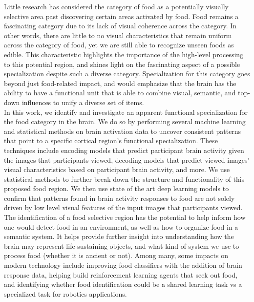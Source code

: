 \documentclass[../thesis.tex]{subfiles}
\begin{document}
Little research has considered the category of food as a potentially visually selective area past discovering certain areas activated by food. Food remains a fascinating category due to its lack of visual coherence across the category. In other words, there are little to no visual characteristics that remain uniform across the category of food, yet we are still able to recognize unseen foods as edible. This characteristic highlights the importance of the high-level processing to this potential region, and shines light on the fascinating aspect of a possible specialization despite such a diverse category. Specialization for this category goes beyond just food-related impact, and would emphasize that the brain has the ability to have a functional unit that is able to combine visual, semantic, and top-down influences to unify a diverse set of items. \\

In this work, we identify and investigate an apparent functional specialization for the food category in the brain. We do so by performing several machine learning and statistical methods on brain activation data to uncover consistent patterns that point to a specific cortical region's functional specialization. These techniques include encoding models that predict participant brain activity given the images that participants viewed, decoding models that predict viewed images' visual characteristics based on participant brain activity, and more. We use statistical methods to further break down the structure and functionality of this proposed food region. We then use state of the art deep learning models to confirm that patterns found in brain activity responses to food are not solely driven by low level visual features of the input images that participants viewed. \\

The identification of a food selective region has the potential to help inform how one would detect food in an environment, as well as how to organize food in a semantic system. It helps provide further insight into understanding how the brain may represent life-sustaining objects, and what kind of system we use to process food (whether it is ancient or not). Among many, some impacts on modern technology include improving food classifiers with the addition of brain response data, helping build reinforcement learning agents that seek out food, and identifying whether food identification could be a shared learning task vs a specialized task for robotics applications. 
\end{document}
